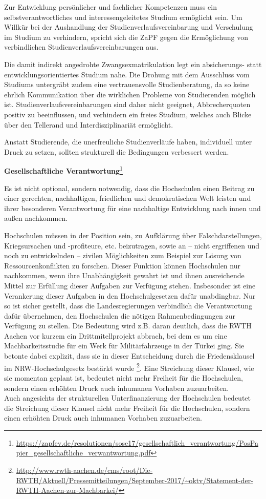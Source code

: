 Zur Entwicklung persönlicher und fachlicher Kompetenzen muss ein selbstverantwortliches und interessengeleitetes Studium ermöglicht sein. Um Willkür bei der Aushandlung der Studienverlaufsvereinbarung und Verschulung im Studium zu verhindern, spricht sich die ZaPF gegen die Ermöglichung von verbindlichen Studienverlaufsvereinbarungen aus.

Die damit indirekt angedrohte Zwangsexmatrikulation legt ein absicherungs- statt entwicklungsorientiertes Studium nahe. Die Drohung mit dem Ausschluss vom Studiums untergräbt zudem eine vertrauensvolle Studienberatung, da so keine ehrlich Kommunikation über die wirklichen Probleme von Studierenden möglich ist. Studienverlaufsvereinbarungen sind daher nicht geeignet, Abbrecherquoten positiv zu beeinflussen, und verhindern ein freies Studium, welches auch Blicke über den Tellerand und Interdisziplinariät ermöglicht.

Anstatt Studierende, die unerfreuliche Studienverläufe haben, individuell unter Druck zu setzen, sollten strukturell die Bedingungen verbessert werden.

\textbf{Gesellschaftliche Verantwortung}\footnote{\url{https://zapfev.de/resolutionen/sose17/gesellschaftlich_verantwortung/PosPapier_gesellschaftliche_verwantwortung.pdf}}

Es ist nicht optional, sondern notwendig, dass die Hochschulen einen Beitrag zu einer gerechten, nachhaltigen, friedlichen und demokratischen Welt leisten und ihrer besonderen Verantwortung für eine nachhaltige Entwicklung nach innen und außen nachkommen.

Hochschulen müssen in der Position sein, zu Aufklärung über Falschdarstellungen, Kriegsursachen und -profiteure, etc. beizutragen, sowie an – nicht ergriffenen und noch zu entwickelnden – zivilen Möglichkeiten zum Beispiel zur Lösung von Ressourcenkonflikten zu forschen. Dieser Funktion können Hochschulen nur nachkommen, wenn ihre Unabhängigkeit gewahrt ist und ihnen ausreichende Mittel zur Erfüllung dieser Aufgaben zur Verfügung stehen.
Insbesonder ist eine Verankerung dieser Aufgaben in den Hochschulgesetzen dafür unabdingbar. Nur so ist sicher gestellt, dass die Landesregierungen verbindlich die Verantwortung dafür übernehmen, den Hochschulen die nötigen Rahmenbedingungen zur Verfügung zu stellen.
Die Bedeutung wird z.B. daran deutlich, dass die RWTH Aachen vor kurzem ein Drittmitellprojekt abbrach, bei dem es um eine Machbarkeitsstudie für ein Werk für Militärfahrzeuge in der Türkei ging. Sie betonte dabei explizit, dass sie in dieser Entscheidung durch die Friedensklausel im NRW-Hochschulgesetz bestärkt wurde \footnote{\url{http://www.rwth-aachen.de/cms/root/Die-RWTH/Aktuell/Pressemitteilungen/September-2017/~oktv/Statement-der-RWTH-Aachen-zur-Machbarkei/}}. Eine Streichung dieser Klausel, wie sie momentan geplant ist, bedeutet nicht mehr Freiheit für die Hochschulen, sondern einen erhöhten Druck auch inhumanen Vorhaben zuzuarbeiten.\\
Auch angesichts der strukturellen Unterfinanzierung der Hochschulen bedeutet die Streichung dieser Klausel nicht mehr Freiheit für die Hochschulen, sondern einen erhöhten Druck auch inhumanen Vorhaben zuzuarbeiten.
